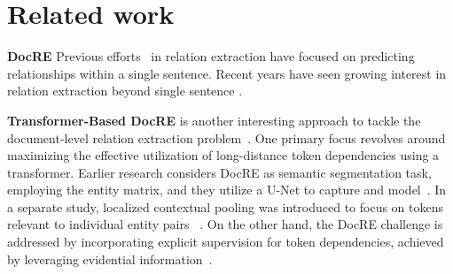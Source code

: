 \documentclass[letterpaper]{article} %
\begin{document}


\section{Related work}
\textbf{DocRE} Previous efforts~\cite{zhang-etal-2018-graph, 10.1007/978-3-031-43421-1_14} in relation extraction have focused on predicting relationships within a single sentence. Recent years have seen growing interest in relation extraction beyond single sentence \cite{yao-etal-2019-docred}.

\textbf{Transformer-Based DocRE} is another interesting approach to tackle the document-level relation extraction problem~\cite{zeng-etal-2020-double}. One primary focus revolves around maximizing the effective utilization of long-distance token dependencies using a transformer. 
Earlier research considers DocRE as semantic segmentation task, employing the entity matrix, and they utilize a U-Net to capture and model~\cite{ijcai2021p551}. 
In a separate study, localized contextual pooling was introduced to focus on tokens relevant to individual entity pairs ~\cite{DBLP:conf/aaai/Zhou0M021}.
On the other hand, the DocRE challenge is addressed by incorporating explicit supervision for token dependencies, achieved by leveraging evidential information~\cite{DBLP:conf/eacl/MaWO23}.  
\end{document}
